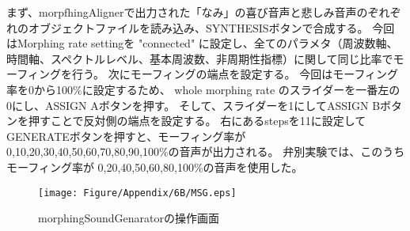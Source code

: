 まず、morpfhingAlignerで出力された「なみ」の喜び音声と悲しみ音声のぞれぞれのオブジェクトファイルを読み込み、SYNTHESISボタンで合成する。
今回はMorphing rate settingを "connected" に設定し、全てのパラメタ（周波数軸、時間軸、スペクトルレベル、基本周波数、非周期性指標）に関して同じ比率でモーフィングを行う。
次にモーフィングの端点を設定する。
今回はモーフィング率を0から100\%に設定するため、 whole morphing rate のスライダーを一番左の0にし、ASSIGN Aボタンを押す。
そして、スライダーを1にしてASSIGN Bボタンを押すことで反対側の端点を設定する。
右にあるstepsを11に設定してGENERATEボタンを押すと、モーフィング率が0,10,20,30,40,50,60,70,80,90,100\%の音声が出力される。
弁別実験では、このうちモーフィング率が 0,20,40,50,60,80,100\%の音声を使用した。

\begin{figure}[h]
  \vspace{10pt}
  \centering
  \texttt{[image: Figure/Appendix/6B/MSG.eps]} 
  \caption{
    morphingSoundGenaratorの操作画面
    }
  \label{fig:MSG}
\end{figure}


